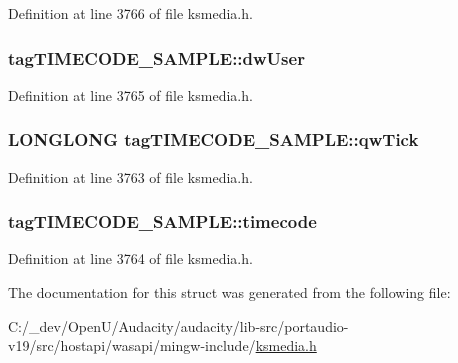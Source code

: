Definition at line 3766 of file ksmedia.\+h.

\subsubsection[{\texorpdfstring{dw\+User}{dwUser}}]{ tag\+T\+I\+M\+E\+C\+O\+D\+E\+\_\+\+S\+A\+M\+P\+L\+E\+::dw\+User}\hypertarget{structtag_t_i_m_e_c_o_d_e___s_a_m_p_l_e_a6d21dcecf7f2bc9cb3d38eb1c2acb6da}{}\label{structtag_t_i_m_e_c_o_d_e___s_a_m_p_l_e_a6d21dcecf7f2bc9cb3d38eb1c2acb6da}


Definition at line 3765 of file ksmedia.\+h.

\subsubsection[{\texorpdfstring{qw\+Tick}{qwTick}}]{\setlength{\rightskip}{0pt plus 5cm}L\+O\+N\+G\+L\+O\+NG tag\+T\+I\+M\+E\+C\+O\+D\+E\+\_\+\+S\+A\+M\+P\+L\+E\+::qw\+Tick}\hypertarget{structtag_t_i_m_e_c_o_d_e___s_a_m_p_l_e_a73ed76bba92ffdec34b564ae48df4124}{}\label{structtag_t_i_m_e_c_o_d_e___s_a_m_p_l_e_a73ed76bba92ffdec34b564ae48df4124}


Definition at line 3763 of file ksmedia.\+h.

\subsubsection[{\texorpdfstring{timecode}{timecode}}]{ tag\+T\+I\+M\+E\+C\+O\+D\+E\+\_\+\+S\+A\+M\+P\+L\+E\+::timecode}\hypertarget{structtag_t_i_m_e_c_o_d_e___s_a_m_p_l_e_ae351cb403b3c30f69c934a012a0eef36}{}\label{structtag_t_i_m_e_c_o_d_e___s_a_m_p_l_e_ae351cb403b3c30f69c934a012a0eef36}


Definition at line 3764 of file ksmedia.\+h.



The documentation for this struct was generated from the following file\+:\begin{DoxyCompactItemize}
\item 
C\+:/\+\_\+dev/\+Open\+U/\+Audacity/audacity/lib-\/src/portaudio-\/v19/src/hostapi/wasapi/mingw-\/include/\hyperlink{ksmedia_8h}{ksmedia.\+h}\end{DoxyCompactItemize}
